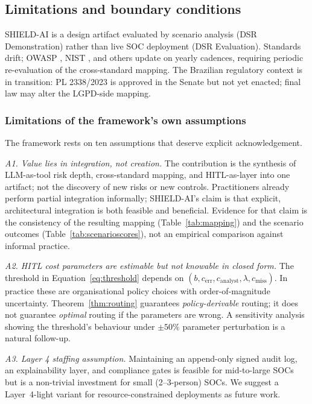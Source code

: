 \documentclass[preprint,12pt,authoryear]{elsarticle}
\begin{document}
\subsection{Limitations and boundary conditions}
SHIELD-AI is a design artifact evaluated by scenario analysis (DSR Demonstration) rather than live SOC deployment (DSR Evaluation). Standards drift; OWASP \citep{owasp2025llm}, NIST \citep{nist2024genai}, and others update on yearly cadences, requiring periodic re-evaluation of the cross-standard mapping. The Brazilian regulatory context is in transition: PL 2338/2023 \citep{pl2338} is approved in the Senate but not yet enacted; final law may alter the LGPD-side mapping.

\subsubsection{Limitations of the framework's own assumptions}
\label{ssec:assumptions}
The framework rests on ten assumptions that deserve explicit acknowledgement.

\emph{A1. Value lies in integration, not creation.} The contribution is the synthesis of LLM-as-tool risk depth, cross-standard mapping, and HITL-as-layer into one artifact; not the discovery of new risks or new controls. Practitioners already perform partial integration informally; SHIELD-AI's claim is that explicit, architectural integration is both feasible and beneficial. Evidence for that claim is the consistency of the resulting mapping (Table~\ref{tab:mapping}) and the scenario outcomes (Table~\ref{tab:scenarioscores}), not an empirical comparison against informal practice.

\emph{A2. HITL cost parameters are estimable but not knowable in closed form.} The threshold in Equation~\ref{eq:threshold} depends on $(b, c_{\text{err}}, c_{\text{analyst}}, \lambda, c_{\text{miss}})$. In practice these are organisational policy choices with order-of-magnitude uncertainty. Theorem~\ref{thm:routing} guarantees \emph{policy-derivable} routing; it does not guarantee \emph{optimal} routing if the parameters are wrong. A sensitivity analysis showing the threshold's behaviour under $\pm 50\%$ parameter perturbation is a natural follow-up.

\emph{A3. Layer 4 staffing assumption.} Maintaining an append-only signed audit log, an explainability layer, and compliance gates is feasible for mid-to-large SOCs but is a non-trivial investment for small (2--3-person) SOCs. We suggest a Layer~4-light variant for resource-constrained deployments as future work.
\end{document}
